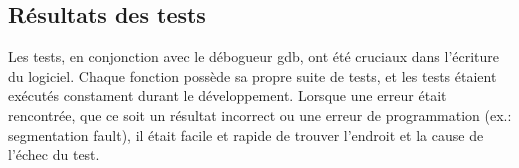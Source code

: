 \documentclass[10pt]{article}
\begin{document}
\subsection{Résultats des tests}

Les tests, en conjonction avec le débogueur gdb, ont été cruciaux dans
l'écriture du logiciel.  Chaque fonction possède sa propre suite de
tests, et les tests étaient exécutés constament durant le
développement.  Lorsque une erreur était rencontrée, que ce soit un
résultat incorrect ou une erreur de programmation (ex.: segmentation
fault), il était facile et rapide de trouver l'endroit et la cause de
l'échec du test.
\end{document}
